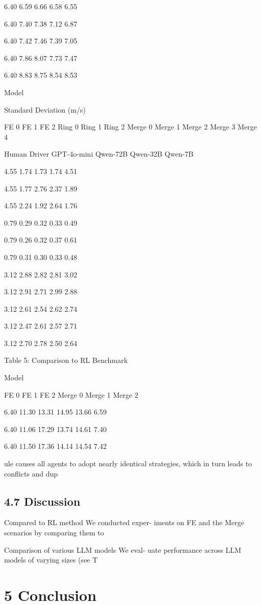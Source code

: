 \documentclass[12pt]{article}
\begin{document}
6.40
6.59
6.66
6.58
6.55


6.40
7.40
7.38
7.12
6.87


6.40
7.42
7.46
7.39
7.05


6.40
7.86
8.07
7.73
7.47


6.40
8.83
8.75
8.54
8.53


Model


Standard Deviation (m/s)


FE 0 FE 1 FE 2 Ring 0 Ring 1 Ring 2 Merge 0 Merge 1 Merge 2 Merge 3 Merge 4


Human Driver
GPT-4o-mini
Qwen-72B
Qwen-32B
Qwen-7B


4.55
1.74
1.73
1.74
4.51


4.55
1.77
2.76
2.37
1.89


4.55
2.24
1.92
2.64
1.76


0.79
0.29
0.32
0.33
0.49


0.79
0.26
0.32
0.37
0.61


0.79
0.31
0.30
0.33
0.48


3.12
2.88
2.82
2.81
3.02


3.12
2.91
2.71
2.99
2.88


3.12
2.61
2.54
2.62
2.74


3.12
2.47
2.61
2.57
2.71


3.12
2.70
2.78
2.50
2.64


Table 5: Comparison to RL Benchmark


Model


FE 0 FE 1 FE 2 Merge 0 Merge 1 Merge 2


6.40
11.30
13.31
14.95
13.66
6.59


6.40
11.06
17.29
13.74
14.61
7.40


6.40
11.50
17.36
14.14
14.54
7.42


ule causes all agents to adopt nearly identical strategies,
which in turn leads to conflicts and dup


\subsection{4.7 Discussion}


Compared to RL method We conducted exper-
iments on FE and the Merge scenarios by comparing
them to 


Comparison of various LLM models We eval-
uate performance across LLM models of varying sizes
(see T


\section{5 Conclusion}
\end{document}
